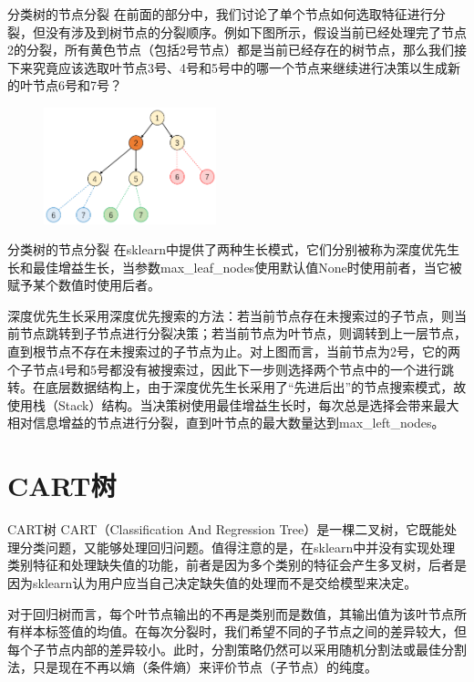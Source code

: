 \documentclass{ctexbeamer}        %
\begin{document}
\begin{frame}{分类树的节点分裂}
在前面的部分中，我们讨论了单个节点如何选取特征进行分裂，但没有涉及到树节点的分裂顺序。例如下图所示，假设当前已经处理完了节点2的分裂，所有黄色节点（包括2号节点）都是当前已经存在的树节点，那么我们接下来究竟应该选取叶节点3号、4号和5号中的哪一个节点来继续进行决策以生成新的叶节点6号和7号？
\begin{figure}
\begin{center}
\includegraphics[width=5cm]{pic1.png}
\end{center}
\end{figure}
\end{frame}

\begin{frame}{分类树的节点分裂}
在sklearn中提供了两种生长模式，它们分别被称为深度优先生长和最佳增益生长，当参数max\_leaf\_nodes使用默认值None时使用前者，当它被赋予某个数值时使用后者。
\newline

深度优先生长采用深度优先搜索的方法：若当前节点存在未搜索过的子节点，则当前节点跳转到子节点进行分裂决策；若当前节点为叶节点，则调转到上一层节点，直到根节点不存在未搜索过的子节点为止。对上图而言，当前节点为2号，它的两个子节点4号和5号都没有被搜索过，因此下一步则选择两个节点中的一个进行跳转。在底层数据结构上，由于深度优先生长采用了“先进后出”的节点搜索模式，故使用栈（Stack）结构。当决策树使用最佳增益生长时，每次总是选择会带来最大相对信息增益的节点进行分裂，直到叶节点的最大数量达到max\_left\_nodes。

\end{frame}

\section{CART树}

\begin{frame}{CART树}
CART（Classification And Regression Tree）是一棵二叉树，它既能处理分类问题，又能够处理回归问题。值得注意的是，在sklearn中并没有实现处理类别特征和处理缺失值的功能，前者是因为多个类别的特征会产生多叉树，后者是因为sklearn认为用户应当自己决定缺失值的处理而不是交给模型来决定。
\newline

对于回归树而言，每个叶节点输出的不再是类别而是数值，其输出值为该叶节点所有样本标签值的均值。在每次分裂时，我们希望不同的子节点之间的差异较大，但每个子节点内部的差异较小。此时，分割策略仍然可以采用随机分割法或最佳分割法，只是现在不再以熵（条件熵）来评价节点（子节点）的纯度。
\end{frame}
\end{document}
